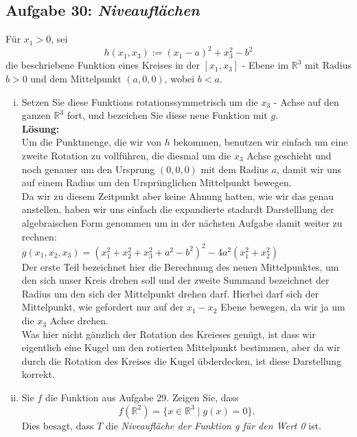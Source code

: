 \subsection*{Aufgabe 30: \mdseries\itshape Niveauflächen}
Für $x_1 > 0$, sei
$$
	h(x_1,x_3) := (x_1 - a)^2 + x_3^2 -b^2
$$
die beschriebene Funktion eines Kreises in der $[x_1,x_3]$ - Ebene im $\mathbb{R}^3$ mit Radius $b > 0$
und dem Mittelpunkt $(a,0,0)$, wobei $b<a$.

\begin{enumerate}[(i)]
	\item Setzen Sie diese Funktions rotationssymmetrisch um die $x_3$ - Achse auf den ganzen $\mathbb{R}^3$ fort,
		und bezeichen Sie diese neue Funktion mit $g$.\\

	\textbf{Lösung:}\\
		Um die Punktmenge, die wir von $h$ bekommen, benutzen wir einfach um eine zweite Rotation zu vollführen,
		die diesmal um die $x_3$ Achse geschieht und noch genauer um den Ursprung $(0,0,0)$ mit dem Radius
		$a$, damit wir uns auf einem Radius um den Ursprünglichen Mittelpunkt bewegen.\\

		Da wir zu diesem Zeitpunkt aber keine Ahnung hatten, wie wir das genau anstellen, haben wir
		uns einfach die expandierte stadardt Darstelllung der algebraischen Form genommen um in der nächsten
		Aufgabe damit weiter zu rechnen:\\
		$g(x_1,x_2,x_3) = (x_1^2+x_2^2+x_3^2 + a^2 - b^2)^2 - 4a^2(x_1^2 + x_2^2)$\\

		Der erste Teil bezeichnet hier die Berechnung des neuen Mittelpunktes, um den sich unser Kreis drehen
		soll und der zweite Summand bezeichnet der Radius um den sich der Mittelpunkt drehen darf. Hierbei
		darf sich der Mittelpunkt, wie gefordert nur auf der $x_1-x_2$ Ebene bewegen, da wir ja um die $x_3$ Achse drehen.\\

		Was hier nicht gänzlich der Rotation des Kreieses genügt, ist dass wir eigentlich eine Kugel um den rotierten Mittelpunkt
		bestimmen, aber da wir durch die Rotation des Kreises die Kugel übderdecken, ist diese Darstellung korrekt.

	\item Sie $f$ die Funktion aus Aufgabe 29. Zeigen Sie, dass
		$$
			f(\mathbb{R}^2) = \{ x \in \mathbb{R}^3 \; | \; g(x) = 0\}.
		$$
		Dies besagt, dass $T$ die \emph{Niveaufläche der Funktion g für den Wert 0} ist.\\


\end{enumerate}
